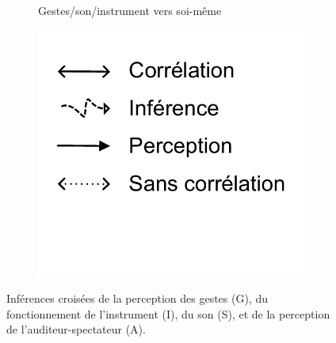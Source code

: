 \begin{figure}[!htbp]
{\begin{subfigure}[b]{.33\textwidth}
			\caption{Gestes/son/instrument vers soi-même}
		\end{subfigure}%
		\hspace{.02\linewidth}
		\begin{subfigure}[b]{.33\textwidth}
			\centering
			\includegraphics[width=0.9\linewidth]{gfx/03_gesture/gesture-inference-legendeR.pdf}
		\end{subfigure}%
	}
	\caption[Inférences croisées de la perception des gestes, du fonctionnement de l'instrument, du son, et de la perception de l'auditeur-spectateur.]{Inférences croisées de la perception des gestes (G), du fonctionnement de l'instrument (I), du son (S), et de la perception de l'auditeur-spectateur (A).}
	\label{fig:gesture:Inferences}
\end{figure}

